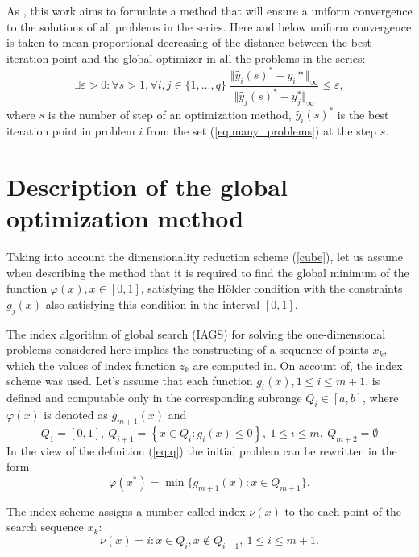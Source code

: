 \documentclass[runningheads]{llncs}
\begin{document}
As \cite{BarkalovStrongin2018}, this work aims to formulate a method that will ensure a uniform convergence to the
solutions of all problems in the series. Here and below uniform convergence is taken to
mean proportional decreasing of the distance between the best iteration point and the
global optimizer in all the problems in the series:
\begin{equation}
  \exists \varepsilon > 0: \forall s>1, \forall i,j\in\{1,\dots,q\}\;
    \frac{\Vert \tilde{y_i}(s)^* - y_i*\Vert_\infty}{\Vert \tilde{y_j}(s)^* - y^*_j\Vert_	\infty} \leqslant \varepsilon,
\end{equation}
where \(s\) is the number of step of an optimization method, \(\tilde{y_i}(s)^*\) is the best iteration point
in problem \(i\) from the set (\ref{eq:many_problems}) at the step \(s\).

\section{Description of the global optimization method}
\label{sec:method}

Taking into account the dimensionality reduction scheme (\ref{cube}), let us assume when
describing the method that it is required to find the global minimum of the function \(\varphi(x),
x\in[0,1]\), satisfying the H\"{o}lder condition with the constraints \(g_j(x)\) also satisfying this
condition in the interval \([0,1]\).

The index algorithm of global search (IAGS) for solving the one-dimensional problems
considered here implies the constructing of a sequence of points
\(x_k\), which the values of index function \(z_k\) are computed in.
On account of, the index scheme \cite{Strongin2000} was used.
Let's assume that each function \(g_i(x), 1 \leqslant i \leqslant m + 1\), is defined and computable
only in the corresponding subrange \(Q_i \in [a, b]\), where \(\varphi(x)\) is denoted as \(g_{m+1}(x)\) and
\begin{equation}
  \label{eq:q}
  Q_1=[0,1],\: Q_{i+1}=\left\{x\in Q_i:g_{i}(x)\leqslant 0\right\},\:1 \leqslant i \leqslant m, \: Q_{m+2}=\emptyset
\end{equation}
In the view of the definition (\ref{eq:q}) the initial problem can be rewritten in the form
\begin{displaymath}
  \varphi(x^*)=\min\{g_{m+1}(x):x\in Q_{m+1}\}.
\end{displaymath}

The index scheme assigns a number called index \(\nu(x)\) to the each point of the search sequence \(x_k\):
\begin{equation}
  \nu(x) = i:x\in Q_i, x\not\in Q_{i+1},\:1\leqslant i\leqslant m + 1.
\end{equation}
\end{document}
